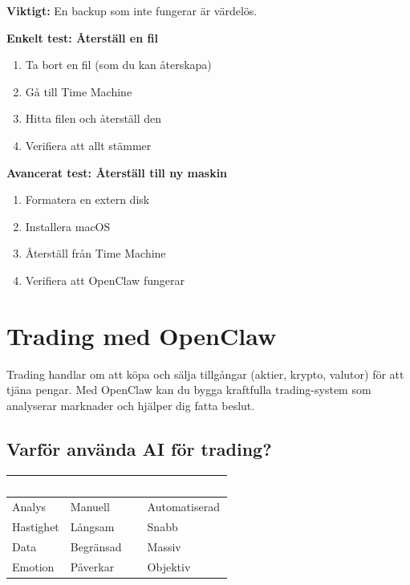 \documentclass[12pt,a4paper,swedish]{article}
\begin{document}
\color{warning}\textbf{Viktigt:}\color{black} En backup som inte fungerar är värdelös.

\bigskip

\textbf{Enkelt test: Återställ en fil}
\begin{enumerate}
    \item Ta bort en fil (som du kan återskapa)
    \item Gå till Time Machine
    \item Hitta filen och återställ den
    \item Verifiera att allt stämmer
\end{enumerate}

\bigskip

\textbf{Avancerat test: Återställ till ny maskin}
\begin{enumerate}
    \item Formatera en extern disk
    \item Installera macOS
    \item Återställ från Time Machine
    \item Verifiera att OpenClaw fungerar
\end{enumerate}

\newpage

\section{Trading med OpenClaw}
\label{sec:del4}

Trading handlar om att köpa och sälja tillgångar (aktier, krypto, valutor) för att tjäna pengar. Med OpenClaw kan du bygga kraftfulla trading-system som analyserar marknader och hjälper dig fatta beslut.

\subsection{Varför använda AI för trading?}
\label{sec:varfor-trading}

\begin{center}
\begin{tabular}{|p{4cm}|p{5cm}|p{5cm}|}
\hline
\rowcolor{secondary}
\textcolor{white}{\textbf{Aspekt}} & \textcolor{white}{\textbf{Traditionell}} & \textcolor{white}{\textbf{AI-assisterad}} \\
\hline
Analys & Manuell & Automatiserad \\
\hline
Hastighet & Långsam & Snabb \\
\hline
Data & Begränsad & Massiv \\
\hline
Emotion & Påverkar & Objektiv \\
\hline
\end{tabular}
\end{center}
\end{document}
